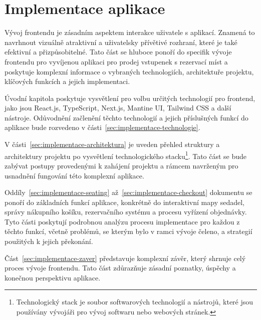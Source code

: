\chapter{Implementace aplikace}
\label{ch:implementace}
Vývoj frontendu je zásadním aspektem interakce uživatele s aplikací.
Znamená to navrhnout vizuálně atraktivní a uživatelsky přívětivé rozhraní, které je také efektivní a přizpůsobitelné.
Tato část se hluboce ponoří do specifik vývoje frontendu pro vyvíjenou aplikaci pro prodej vstupenek s rezervací míst a poskytuje komplexní informace o vybraných technologiích, architektuře projektu, klíčových funkcích a jejich implementaci.

Úvodní kapitola poskytuje vysvětlení pro volbu určitých technologií pro frontend, jako jsou React.js, TypeScript, Next.js, Mantine UI, Tailwind CSS a další nástroje.
Odůvodnění začlenění těchto technologií a jejich příslušných funkcí do aplikace bude rozvedeno v části~\ref{sec:implementace-technologie}.

V části~\ref{sec:implementace-architektura} je uveden přehled struktury a architektury projektu po vysvětlení technologického stacku\footnote{Technologický stack je soubor softwarových technologií a nástrojů, které jsou používány vývojáři pro vývoj softwaru nebo webových stránek.}.
Tato část se bude zabývat postupy provedenými k zahájení projektu a rámcem navrženým pro usnadnění fungování této komplexní aplikace.

Oddíly~\ref{sec:implementace-seating} až~\ref{sec:implementace-checkout} dokumentu se ponoří do základních funkcí aplikace, konkrétně do interaktivní mapy sedadel, správy nákupního košíku, rezervačního systému a procesu vyřízení objednávky.
Tyto části poskytují podrobnou analýzu procesu implementace pro každou z těchto funkcí, včetně problémů, se kterým bylo v ramci vývoje čeleno, a strategií použitých k jejich překonání.

Část~\ref{sec:implementace-zaver} představuje komplexní závěr, který shrnuje celý proces vývoje frontendu.
Tato část zdůrazňuje zásadní poznatky, úspěchy a konečnou perspektivu aplikace.
